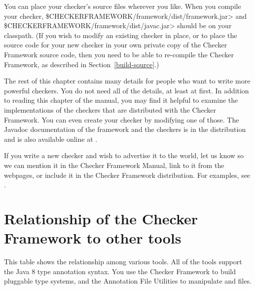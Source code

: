 \begin{sloppypar}
You can place your checker's source files wherever you like.  When you
compile your checker, \<\$CHECKERFRAMEWORK/framework/dist/framework.jar> and \<\$CHECKERFRAMEWORK/framework/dist/javac.jar>
should be on your classpath.  (If you wish to modify an existing checker in place,
or to place the source code for your new checker in your own private copy of the
Checker Framework source code, then you need to be able to re-compile the
Checker Framework, as described in Section~\ref{build-source}.)
\end{sloppypar}

The rest of this chapter contains many details for people who want to write more powerful
checkers.
You do not need all of the details, at least at first.
In addition to reading this chapter of the manual, you may find it helpful
to examine the implementations of the checkers that are distributed with
the Checker Framework.  You can even create your checker by modifying one
of those.
The Javadoc documentation of the framework and the checkers is in the
distribution and is also available online at
.

If you write a new checker and wish to advertise it to the world, let us
know so we can mention it in the Checker Framework Manual, link to
it from the webpages, or include it in the Checker Framework distribution.
For examples, see .


\section{Relationship of the Checker Framework to other tools\label{tool-relationships}}

This table shows the relationship among various tools.
All of the tools support the Java 8 type annotation syntax.
You use the Checker Framework to build pluggable type systems, and the
Annotation File Utilities to manipulate  and  files.

\newlength{\bw}
\setlength{\bw}{.5in}


